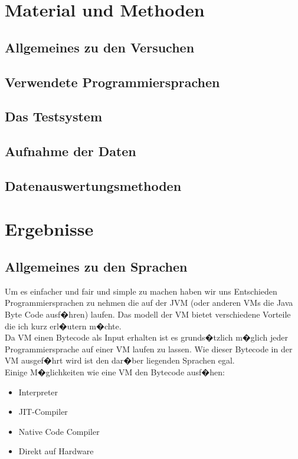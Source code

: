 \documentclass{fancydocument}
\begin{document}
\section{Material und Methoden}
\subsection{Allgemeines zu den Versuchen}
\subsection{Verwendete Programmiersprachen}
\subsection{Das Testsystem}
\subsection{Aufnahme der Daten}
\subsection{Datenauswertungsmethoden}
\section{Ergebnisse}

\subsection{Allgemeines zu den Sprachen}

Um es einfacher und fair und simple  zu machen haben wir uns Entschieden
Programmiersprachen zu nehmen die auf der JVM (oder anderen VMs die
Java Byte Code ausf�hren) laufen. Das modell der VM bietet
verschiedene Vorteile die ich kurz erl�utern m�chte.
\\
Da VM einen Bytecode als Input erhalten ist es grunds�tzlich m�glich
jeder Programmiersprache auf einer VM laufen zu lassen. Wie dieser
Bytecode in der VM ausgef�hrt wird ist den dar�ber liegenden Sprachen
egal.\\ 
Einige M�glichkeiten wie eine VM den Bytecode ausf�hen:

\begin{itemize}
\item Interpreter
\item JIT-Compiler
\item Native Code Compiler
\item Direkt auf Hardware
\end{itemize}
\end{document}
